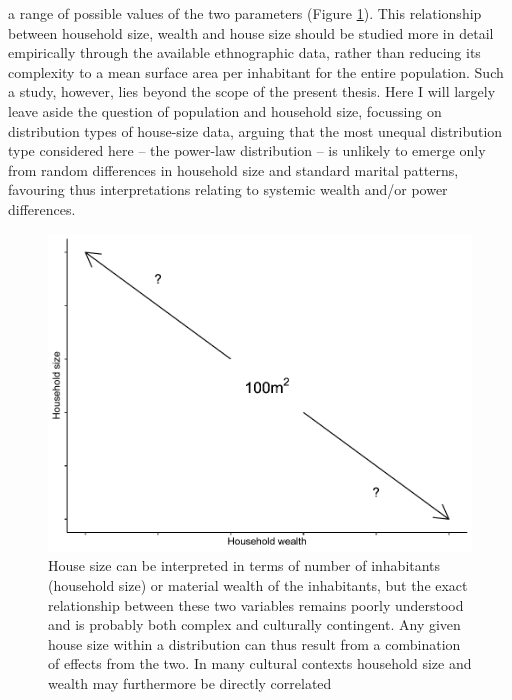 \documentclass[
  12pt,
  a4paper, twoside]{book}
\begin{document}
a range of possible values of the two parameters (Figure \ref{fig:04-intro}). This relationship between household size, wealth and house size should be studied more in detail empirically through the available ethnographic data, rather than reducing its complexity to a mean surface area per inhabitant for the entire population. Such a study, however, lies beyond the scope of the present thesis. Here I will largely leave aside the question of population and household size, focussing on distribution types of house-size data, arguing that the most unequal distribution type considered here -- the power-law distribution -- is unlikely to emerge only from random differences in household size and standard marital patterns, favouring thus interpretations relating to systemic wealth and/or power differences.



\begin{figure}

{\centering \includegraphics[width=0.9\linewidth]{bookdown-demo_files/figure-latex/04-intro-1} 

}

\caption[House size, household size and wealth]{House size can be interpreted in terms of number of inhabitants (household size) or material wealth of the inhabitants, but the exact relationship between these two variables remains poorly understood and is probably both complex and culturally contingent. Any given house size within a distribution can thus result from a combination of effects from the two. In many cultural contexts household size and wealth may furthermore be directly correlated}\label{fig:04-intro}
\end{figure}
\end{document}

